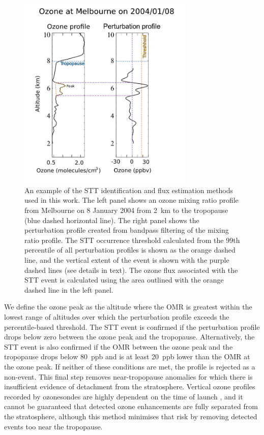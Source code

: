     \begin{figure}[t]
      
      \includegraphics[width=8.3cm]{figures/filtereg.png}
      \caption{ %
	An example of the STT identification and flux estimation methods used in this work. 
	The left panel shows an ozone mixing ratio profile from Melbourne on 8 January 2004 from 2~km to the tropopause (blue dashed horizontal line).
	The right panel shows the perturbation profile created from bandpass filtering of the mixing ratio profile. The STT occurrence threshold calculated from the 99th percentile of all perturbation profiles is shown as the orange dashed line, and the vertical extent of the event is shown with the purple dashed lines (see details in text).
	The ozone flux associated with the STT event is calculated using the area outlined with the orange dashed line in the left panel.
      }
      \label{fig:filterEG}
      
    \end{figure}
   
       
    We define the ozone peak as the altitude where the OMR is greatest within the lowest range of altitudes over which the perturbation profile exceeds the percentile-based threshold.
    The STT event is confirmed if the perturbation profile drops below zero between the ozone peak and the tropopause. 
    Alternatively, the STT event is also confirmed if the OMR between the ozone peak and the tropopause drops below 80~ppb and is at least 20~ppb lower than the OMR at the ozone peak. 
    If neither of these conditions are met, the profile is rejected as a non-event.
    This final step removes near-tropopause anomalies for which there is insufficient evidence of detachment from the stratosphere.
    Vertical ozone profiles recorded by ozonesondes are highly dependent on the time of launch \citep{Sprenger2003}, and it cannot be guaranteed that detected ozone enhancements are fully separated from the stratosphere, although this method minimises that risk by removing detected events too near the tropopause.

